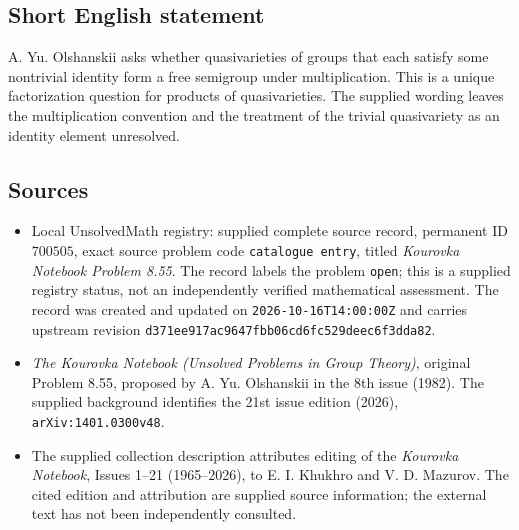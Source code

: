 \documentclass[11pt]{article}
\begin{document}
\subsection{Short English statement}
A. Yu. Olshanskii asks whether quasivarieties of groups that each satisfy some nontrivial identity form a free semigroup under multiplication. This is a unique factorization question for products of quasivarieties. The supplied wording leaves the multiplication convention and the treatment of the trivial quasivariety as an identity element unresolved.
\subsection{Sources}
\begin{itemize}
\item Local UnsolvedMath registry: supplied complete source record, permanent ID \(700505\), exact source problem code \texttt{catalogue entry}, titled \emph{Kourovka Notebook Problem 8.55}. The record labels the problem \texttt{open}; this is a supplied registry status, not an independently verified mathematical assessment. The record was created and updated on \texttt{2026-10-16T14:00:00Z} and carries upstream revision \texttt{d371ee917ac9647fbb06cd6fc529deec6f3dda82}.
\item \emph{The Kourovka Notebook (Unsolved Problems in Group Theory)}, original Problem 8.55, proposed by A. Yu. Olshanskii in the 8th issue (1982). The supplied background identifies the 21st issue edition (2026), \texttt{arXiv:1401.0300v48}.
\item The supplied collection description attributes editing of the \emph{Kourovka Notebook}, Issues 1--21 (1965--2026), to E. I. Khukhro and V. D. Mazurov. The cited edition and attribution are supplied source information; the external text has not been independently consulted.
\end{itemize}
\end{document}
